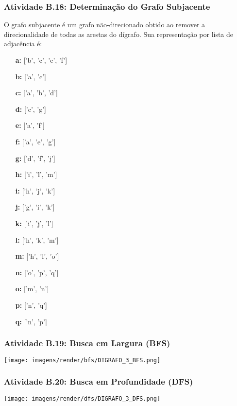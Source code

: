 \documentclass[a4paper,12pt]{article}
\begin{document}
\subsubsection*{Atividade B.18: Determinação do Grafo Subjacente}
O grafo subjacente é um grafo não-direcionado obtido ao remover a direcionalidade de todas as arestas do dígrafo. Sua representação por lista de adjacência é:
\begin{itemize}[leftmargin=*]
    \item[\textbf{a:}] ['b', 'c', 'e', 'f'] \item[\textbf{b:}] ['a', 'c'] \item[\textbf{c:}] ['a', 'b', 'd']
    \item[\textbf{d:}] ['c', 'g'] \item[\textbf{e:}] ['a', 'f'] \item[\textbf{f:}] ['a', 'e', 'g']
    \item[\textbf{g:}] ['d', 'f', 'j'] \item[\textbf{h:}] ['i', 'l', 'm'] \item[\textbf{i:}] ['h', 'j', 'k']
    \item[\textbf{j:}] ['g', 'i', 'k'] \item[\textbf{k:}] ['i', 'j', 'l'] \item[\textbf{l:}] ['h', 'k', 'm']
    \item[\textbf{m:}] ['h', 'l', 'o'] \item[\textbf{n:}] ['o', 'p', 'q'] \item[\textbf{o:}] ['m', 'n']
    \item[\textbf{p:}] ['n', 'q'] \item[\textbf{q:}] ['n', 'p']
\end{itemize}

\subsubsection*{Atividade B.19: Busca em Largura (BFS)}
\begin{center}
    \texttt{[image: imagens/render/bfs/DIGRAFO\_3\_BFS.png]}
\end{center}

\subsubsection*{Atividade B.20: Busca em Profundidade (DFS)}
\begin{center}
    \texttt{[image: imagens/render/dfs/DIGRAFO\_3\_DFS.png]}
\end{center}
\end{document}

